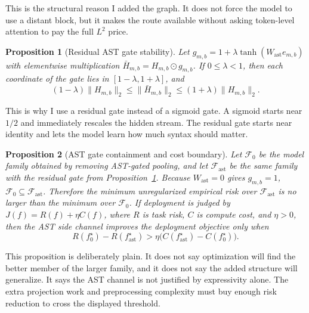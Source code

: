 \documentclass[10pt]{article}
\newtheorem{proposition}{Proposition}
\begin{document}
This is the structural reason I added the graph.  It does not force the model to
use a distant block, but it makes the route available without asking token-level
attention to pay the full $L^2$ price.

\begin{proposition}[Residual AST gate stability]
\label{prop:gate}
Let $g_{m,b}=1+\lambda\tanh(W_{\mathrm{ast}}e_{m,b})$ with elementwise
multiplication $\bar H_{m,b}=H_{m,b}\odot g_{m,b}$.  If $0\le\lambda<1$, then
each coordinate of the gate lies in $[1-\lambda,1+\lambda]$, and
\[
  (1-\lambda)\|H_{m,b}\|_2
  \le \|\bar H_{m,b}\|_2
  \le (1+\lambda)\|H_{m,b}\|_2 .
\]
\end{proposition}


This is why I use a residual gate instead of a sigmoid gate.  A sigmoid starts
near $1/2$ and immediately rescales the hidden stream.  The residual gate starts
near identity and lets the model learn how much syntax should matter.

\begin{proposition}[AST gate containment and cost boundary]
\label{prop:ast-cost}
Let $\mathcal{F}_0$ be the model family obtained by removing AST-gated pooling,
and let $\mathcal{F}_{\mathrm{ast}}$ be the same family with the residual gate
from Proposition~\ref{prop:gate}.  Because $W_{\mathrm{ast}}=0$ gives
$g_{m,b}=1$, $\mathcal{F}_0\subseteq\mathcal{F}_{\mathrm{ast}}$.  Therefore the
minimum unregularized empirical risk over $\mathcal{F}_{\mathrm{ast}}$ is no
larger than the minimum over $\mathcal{F}_0$.  If deployment is judged by
$J(f)=R(f)+\eta C(f)$, where $R$ is task risk, $C$ is compute cost, and
$\eta>0$, then the AST side channel improves the deployment objective only when
\[
  R(f_0^\star)-R(f_{\mathrm{ast}}^\star)
  >
  \eta\big(C(f_{\mathrm{ast}}^\star)-C(f_0^\star)\big).
\]
\end{proposition}


This proposition is deliberately plain.  It does not say optimization will find
the better member of the larger family, and it does not say the added structure
will generalize.  It says the AST channel is not justified by expressivity
alone.  The extra projection work and preprocessing complexity must buy enough
risk reduction to cross the displayed threshold.
\end{document}
